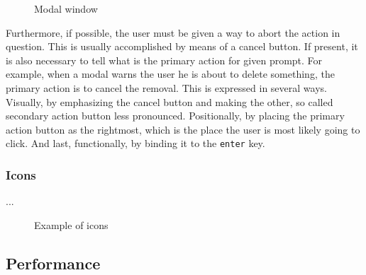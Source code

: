 \documentclass[thesis=M,english,hidelinks]{FITthesis}[2012/10/20]
\newcommand{\code}{\texttt}
\begin{document}
\begin{figure}
  \setlength\fboxsep{0pt}
  \setlength\fboxrule{0.2pt}
  \caption{Modal window}
  \label{fig:modal}
\end{figure}

Furthermore, if possible, the user must be given a way to abort the action in question. This is usually accomplished by means of a cancel button. If present, it is also necessary to tell what is the primary action for given prompt. For example, when a modal warns the user he is about to delete something, the primary action is to cancel the removal. This is expressed in several ways. Visually, by emphasizing the cancel button and making the other, so called secondary action button less pronounced. Positionally, by placing the primary action button as the rightmost, which is the place the user is most likely going to click. And last, functionally, by binding it to the \code{enter} key.

    \subsubsection{Icons}

    ...

\begin{figure}[H]
  \setlength\fboxsep{0pt}
  \setlength\fboxrule{0.2pt}
  \caption{Example of icons}
  \label{fig:icons}
\end{figure}

  \subsection{Performance}
\end{document}
